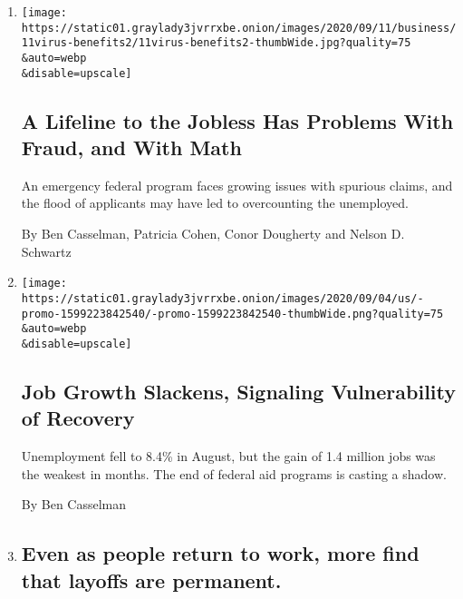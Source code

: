 \begin{enumerate}
\def\labelenumi{\arabic{enumi}.}
\item
  \href{/2020/09/11/business/economy/pandemic-unemployment-assistance-fraud.html}{}

  \texttt{[image: https://static01.graylady3jvrrxbe.onion/images/2020/09/11/business/11virus-benefits2/11virus-benefits2-thumbWide.jpg?quality=75\\\&auto=webp\\\&disable=upscale]}

  \hypertarget{a-lifeline-to-the-jobless-has-problems-with-fraud-and-with-math}{%
  \subsection{A Lifeline to the Jobless Has Problems With Fraud, and
  With
  Math}\label{a-lifeline-to-the-jobless-has-problems-with-fraud-and-with-math}}

  An emergency federal program faces growing issues with spurious
  claims, and the flood of applicants may have led to overcounting the
  unemployed.

  By Ben Casselman, Patricia Cohen, Conor Dougherty and Nelson D.
  Schwartz
\item
  \href{/2020/09/04/business/economy/jobs-report.html}{}

  \texttt{[image: https://static01.graylady3jvrrxbe.onion/images/2020/09/04/us/-promo-1599223842540/-promo-1599223842540-thumbWide.png?quality=75\\\&auto=webp\\\&disable=upscale]}

  \hypertarget{job-growth-slackens-signaling-vulnerability-of-recovery}{%
  \subsection{Job Growth Slackens, Signaling Vulnerability of
  Recovery}\label{job-growth-slackens-signaling-vulnerability-of-recovery}}

  Unemployment fell to 8.4\% in August, but the gain of 1.4 million jobs
  was the weakest in months. The end of federal aid programs is casting
  a shadow.

  By Ben Casselman
\item
  \href{/2020/09/04/business/even-as-people-return-to-work-more-find-that-layoffs-are-permanent.html}{}

  \hypertarget{even-as-people-return-to-work-more-find-that-layoffs-are-permanent}{%
  \subsection{Even as people return to work, more find that layoffs are
  permanent.}\label{even-as-people-return-to-work-more-find-that-layoffs-are-permanent}}


\end{enumerate}
